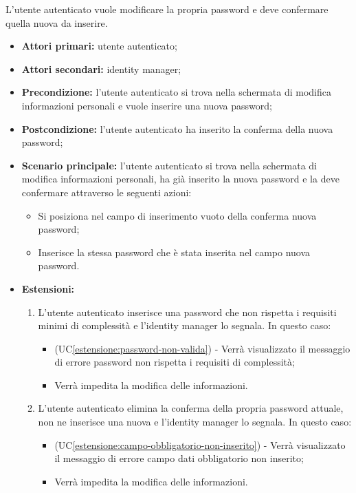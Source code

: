 \label{modifica-password.conferma-nuova-password}

L'utente autenticato vuole modificare la propria password e deve confermare quella nuova da inserire.
\begin{itemize}
    \item \textbf{Attori primari:} utente autenticato;
    \item \textbf{Attori secondari:} identity manager;
    \item \textbf{Precondizione:} l'utente autenticato si trova nella schermata di modifica informazioni personali e vuole inserire una nuova password;
    \item \textbf{Postcondizione:} l'utente autenticato ha inserito la conferma della nuova password;
    \item \textbf{Scenario principale:} l'utente autenticato si trova nella schermata di modifica informazioni personali, ha già inserito la nuova password e la deve confermare attraverso le seguenti azioni:
    \begin{itemize}
        \item Si posiziona nel campo di inserimento vuoto della conferma nuova password;
        \item Inserisce la stessa password che è stata inserita nel campo nuova password.
    \end{itemize}
    \item \textbf{Estensioni:}
    \begin{enumerate}[label=\lett]
        \item L'utente autenticato inserisce una password che non rispetta i requisiti minimi di complessità e l'identity manager lo segnala. In questo caso:
        \begin{itemize}
            \item (UC\ref{estensione:password-non-valida}) - Verrà visualizzato il messaggio di errore password non rispetta i requisiti di complessità;
            \item Verrà impedita la modifica delle informazioni.
        \end{itemize}
        \item L'utente autenticato elimina la conferma della propria password attuale, non ne inserisce una nuova e l'identity manager lo segnala. In questo caso:
        \begin{itemize}
            \item (UC\ref{estensione:campo-obbligatorio-non-inserito}) - Verrà visualizzato il messaggio di errore campo dati obbligatorio non inserito;
            \item Verrà impedita la modifica delle informazioni.
        \end{itemize}
    \end{enumerate}
\end{itemize}
